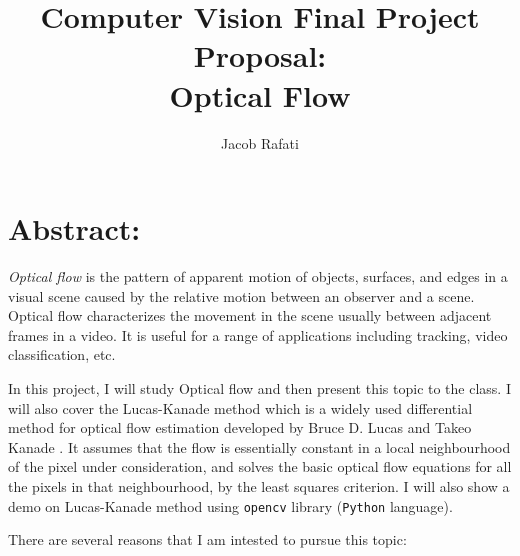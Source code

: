 \documentclass[11pt]{article}
\theoremstyle{plain}
\theoremstyle{definition}
\begin{document}
\title{Computer Vision Final Project Proposal: \\ Optical Flow}
\author{Jacob Rafati}
\date{}
\maketitle

\section*{Abstract:}

\emph{Optical flow} is the pattern of apparent motion of objects, surfaces, and edges in a visual scene caused by the relative motion between an observer and a scene. Optical flow characterizes the movement in the scene usually between adjacent frames in a video. It is useful for a range of applications including tracking, video classification, etc. 

In this project, I will study Optical flow and then present this topic to the class. I will also cover the Lucas-Kanade method which is a widely used differential method for optical flow estimation developed by Bruce D. Lucas and Takeo Kanade \citep{Lucas:Kanade:1981}. It assumes that the flow is essentially constant in a local neighbourhood of the pixel under consideration, and solves the basic optical flow equations for all the pixels in that neighbourhood, by the least squares criterion. I will also show a demo on Lucas-Kanade method using \texttt{opencv} library (\texttt{Python} language). 

There are several reasons that I am intested to pursue this topic:
\end{document}
